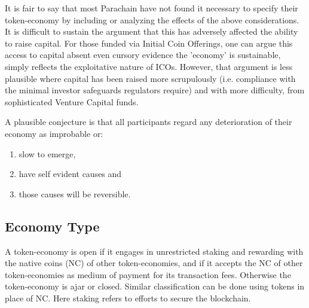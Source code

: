 \documentclass[11pt]{article}
\begin{document}
It is fair to say that most Parachain have not found it necessary to specify their token-economy by including or analyzing the effects of the above considerations. 
It is difficult to sustain the argument that this has adversely affected the ability to raise capital. For those funded via Initial Coin Offerings, one can argue this access to capital absent even cursory evidence the 'economy' is sustainable, simply reflects the exploitative nature of ICOs. However, that argument is less plausible where capital has been raised more scrupulously (i.e. compliance with the minimal investor safeguards regulators require) and with more difficulty, from sophisticated Venture Capital funds.

A plausible conjecture is that all participants regard any deterioration of their economy as improbable or:
\begin{enumerate}
    \item slow to emerge,
    \item have self evident causes and
    \item those causes will be reversible.
\end{enumerate}

\subsection{Economy Type}
A token-economy is open if it engages in unrestricted staking and rewarding with the native coins (NC) of other token-economies, and if it accepts the NC of other token-economies as medium of payment for its transaction fees. Otherwise the token-economy is ajar or closed.  Similar classification can be done using tokens in place of NC. Here staking refers to efforts to secure the blockchain.
\end{document}

